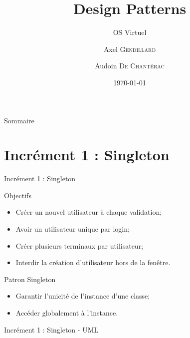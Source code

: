 \documentclass[utf8, 14pt]{beamer}
\title[Design Patterns]{Design Patterns}
\subtitle{OS Virtuel}
\author[Axel G. | Audoin De C.]{Axel \textsc{Gendillard} \and Audoin \textsc{De Chantérac}}
\institute[]
{
	Étudiant ingénieur\\ 
	Groupe ESEO \\
}
\date{\today}
\begin{document}
\begin{frame}
\titlepage
\end{frame}

\begin{frame}{Sommaire}
\tableofcontents
\end{frame} 


\section{Incrément 1 : Singleton}
	
	\begin{frame}{Incrément 1 : Singleton}
		\begin{block}{Objectifs}
		\begin{itemize}
		\item Créer un nouvel utilisateur à chaque validation;
		\item Avoir un utilisateur unique par login;
		\item Créer plusieurs terminaux par utilisateur;
		\item Interdir la création d'utilisateur hors de la fenêtre.
		\end{itemize}
		\end{block}
		
		\begin{exampleblock}{Patron Singleton}
		\begin{itemize}
		\item Garantir l'unicité de l'instance d'une classe;
		\item Accéder globalement à l'instance.
		\end{itemize}
		\end{exampleblock}					
	\end{frame}

	\begin{frame}{Incrément 1 : Singleton - UML}
		\begin{center}
		\end{center}		
	\end{frame}

\end{document}
